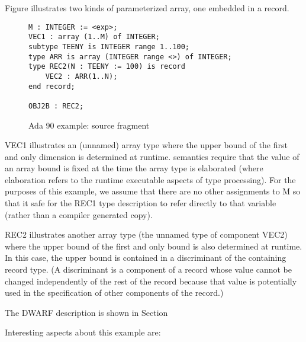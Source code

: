 Figure 
illustrates two kinds of  
parameterized array, one embedded in a record.


\begin{figure}[here]
\begin{lstlisting}
M : INTEGER := <exp>;
VEC1 : array (1..M) of INTEGER;
subtype TEENY is INTEGER range 1..100;
type ARR is array (INTEGER range <>) of INTEGER;
type REC2(N : TEENY := 100) is record
    VEC2 : ARR(1..N);
end record;

OBJ2B : REC2;
\end{lstlisting}
\caption{Ada 90 example: source fragment} \label{fig:adaexamplesourcefragment}
\end{figure}

VEC1 illustrates an (unnamed) array type where the upper bound
of the first and only dimension is determined at runtime. 
semantics require that the value of an array bound is fixed at
the time the array type is elaborated (where elaboration refers
to the runtime executable aspects of type processing). For
the purposes of this example, we assume that there are no
other assignments to M so that it safe for the REC1 type
description to refer directly to that variable (rather than
a compiler generated copy).

REC2 illustrates another array type (the unnamed type of
component VEC2) where the upper bound of the first and only
bound is also determined at runtime. In this case, the upper
bound is contained in a discriminant of the containing record
type. (A discriminant is a component of a record whose value
cannot be changed independently of the rest of the record
because that value is potentially used in the specification
of other components of the record.)

The DWARF description is shown in 
Section 


Interesting aspects about this example are:

